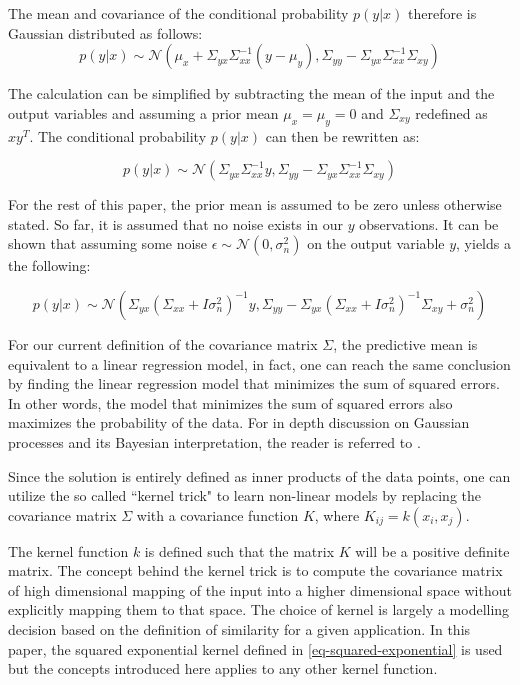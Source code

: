 \documentclass[a4paper,12pt]{article}
\begin{document}
The mean and covariance of the conditional probability $p(y|x)$ therefore is Gaussian distributed as follows:
\begin{equation}
p(y|x) \sim  \mathcal{N} \left ( \mu_{x}+\Sigma_{yx}\Sigma_{xx}^{-1}\left ( y-\mu_{y}\right ), \Sigma_{yy}-\Sigma_{yx}\Sigma_{xx}^{-1}\Sigma_{xy}\right )
\end{equation}

The calculation can be simplified by subtracting the mean of the input and the output variables and assuming a prior mean $\mu_{x}=\mu_{y}=0$ and $\Sigma_{xy}$ redefined as $xy^{T}$. The conditional probability $p(y|x)$ can then be rewritten as:

\begin{equation}
\label{eq-conditional-zero-mean}
p(y|x) \sim  \mathcal{N} \left ( \Sigma_{yx}\Sigma_{xx}^{-1}y, \Sigma_{yy}-\Sigma_{yx}\Sigma_{xx}^{-1}\Sigma_{xy}\right )
\end{equation}

For the rest of this paper, the prior mean is assumed to be zero unless otherwise stated. So far, it is assumed that no noise exists in our $y$ observations. It can be shown that assuming some noise $\epsilon \sim \mathcal{N}\left(0,\sigma_{n}^{2}\right)$ on the output variable $y$, yields a the following:

\begin{equation}
\label{eq-mean-variance-noise}
p(y|x) \sim  \mathcal{N} \left ( \Sigma_{yx}\left(\Sigma_{xx}+I\sigma_{n}^{2}\right)^{-1}y, \Sigma_{yy}-\Sigma_{yx}\left(\Sigma_{xx}+I\sigma_{n}^{2}\right)^{-1}\Sigma_{xy}+\sigma_{n}^{2}\right )
\end{equation}

For our current definition of the covariance matrix $\Sigma$, the predictive mean is equivalent to a linear regression model, in fact, one can reach the same conclusion by finding the linear regression model that minimizes the sum of squared errors. In other words, the model that minimizes the sum of squared errors also maximizes the probability of the data. For in depth discussion on Gaussian processes and its Bayesian interpretation, the reader is referred to \cite{}.

Since the solution is entirely defined as inner products of the data points, one can utilize the so called ``kernel trick" to learn non-linear models by replacing the covariance matrix $\Sigma$ with a covariance function $K$, where $K_{ij} = k(x_{i},x_{j})$.

The kernel function $k$ is defined such that the matrix $K$ will be a positive definite matrix. The concept behind the kernel trick is to compute the covariance matrix of high dimensional mapping of the input into a higher dimensional space without explicitly mapping them to that space. The choice of kernel is largely a modelling decision based on the definition of similarity for a given application. In this paper, the squared exponential kernel defined in \eqref{eq-squared-exponential} is used but the concepts introduced here applies to any other kernel function.
\end{document}
